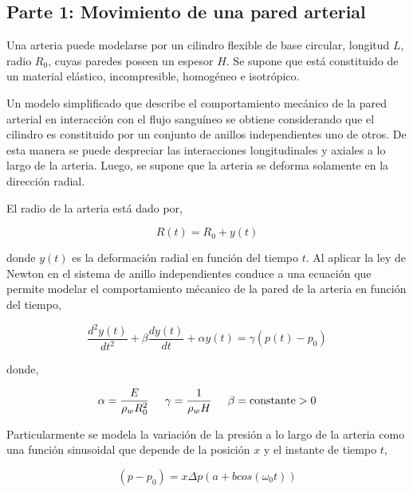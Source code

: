 
\subsection{Parte 1: Movimiento de una pared arterial}

Una arteria puede modelarse por un cilindro flexible de base circular, longitud $L$, radio $R_0$, cuyas paredes poseen un espesor $H$. Se supone que está constituido de un material elástico, incompresible, homogéneo e isotrópico. 

Un modelo simplificado que describe el comportamiento mecánico de la pared arterial en interacción con el flujo sanguíneo se obtiene considerando que el cilindro es constituido por un conjunto de anillos independientes uno de otros. De esta manera se puede despreciar las interacciones longitudinales y axiales a lo largo de la arteria. Luego, se supone que la arteria se deforma solamente en la dirección radial.

El radio de la arteria está dado por,

\begin{equation}
R(t) = R_0 + y(t)
\end{equation}

donde $y(t)$ es la deformación radial en función del tiempo $t$. Al aplicar la ley de Newton en el sistema de anillo independientes conduce a una ecuación que permite modelar el comportamiento mécanico de la pared de la arteria en función del tiempo,

\begin{equation} \label{PROBLEMA_PARTE2}
\dfrac{d^2 y(t)}{dt^2} + \beta \dfrac{dy(t)}{dt} + \alpha y(t) = \gamma (p(t)-p_0)
\end{equation}

donde,

\begin{equation}
\alpha = \dfrac{E}{\rho_w R^2_0} \hspace{0,5cm} \gamma = \dfrac{1}{\rho_w H} \hspace{0,5cm} \beta = \mbox{constante} > 0 
\end{equation}

Particularmente se modela la variación de la presión a lo largo de la arteria como una función sinusoidal que depende de la posición $x$ y el instante de tiempo $t$,

\begin{equation} \label{FUENTE_PARTE2}
(p-p_0) = x \Delta p  \left( a + b cos( \omega_0 t ) \right)
\end{equation} 

